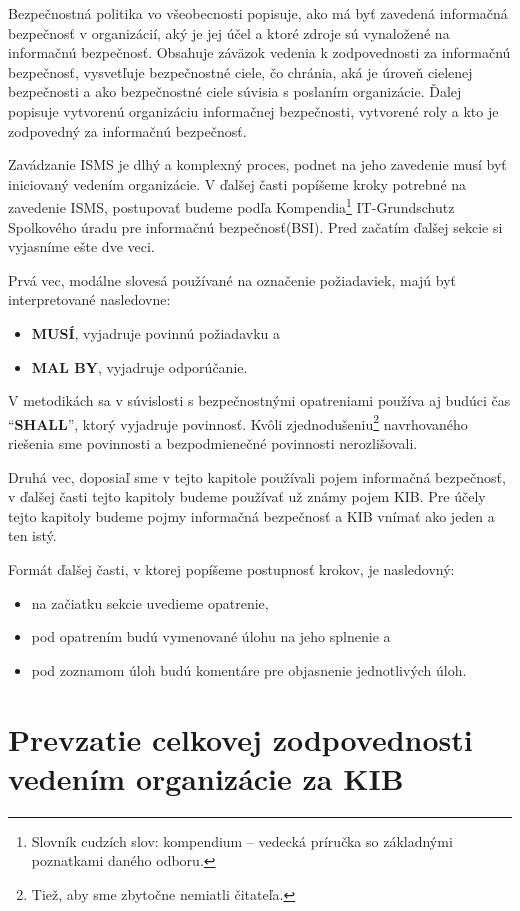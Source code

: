 Bezpečnostná politika vo všeobecnosti popisuje, ako má byť zavedená informačná bezpečnosť v organizácií, aký je jej účel
a ktoré zdroje sú vynaložené na informačnú bezpečnosť. Obsahuje záväzok vedenia k zodpovednosti za informačnú bezpečnosť,
vysvetľuje bezpečnostné ciele, čo chránia, aká je úroveň cielenej bezpečnosti a ako bezpečnostné ciele súvisia s poslaním
organizácie. Ďalej popisuje vytvorenú organizáciu informačnej bezpečnosti, vytvorené roly a kto je zodpovedný za informačnú
bezpečnosť.


Zavádzanie ISMS je dlhý a komplexný proces, podnet na jeho zavedenie musí byť iniciovaný vedením organizácie. V ďalšej časti
popíšeme kroky potrebné na zavedenie ISMS, postupovať budeme podľa Kompendia\footnote{Slovník cudzích slov: kompendium – vedecká
príručka so základnými poznatkami daného odboru.} IT-Grundschutz\cite{GSK} Spolkového úradu pre informačnú bezpečnosť(BSI).
Pred začatím ďalšej sekcie si vyjasníme ešte dve veci.

Prvá vec, modálne slovesá používané na označenie požiadaviek, majú byť interpretované nasledovne:
\begin{itemize}
  \item \textbf{MUSÍ}, vyjadruje povinnú požiadavku a
  \item \textbf{MAL BY}, vyjadruje odporúčanie. 
\end{itemize}
V metodikách sa v súvislosti s bezpečnostnými opatreniami používa aj budúci čas \enquote{\textbf{SHALL}}, ktorý vyjadruje
povinnosť. Kvôli zjednodušeniu\footnote{Tiež, aby sme zbytočne nemiatli čitateľa.} navrhovaného riešenia sme povinnosti
a bezpodmienečné povinnosti nerozlišovali.

Druhá vec, doposiaľ sme v tejto kapitole používali pojem informačná bezpečnosť, v ďalšej časti tejto kapitoly budeme používať
už známy pojem KIB. Pre účely tejto kapitoly budeme pojmy informačná bezpečnosť a KIB vnímať ako jeden a ten istý.

Formát ďalšej časti, v ktorej popíšeme postupnosť krokov, je nasledovný:
\begin{itemize}
  \item na začiatku sekcie uvedieme opatrenie,
  \item pod opatrením budú vymenované úlohu na jeho splnenie a 
  \item pod zoznamom úloh budú komentáre pre objasnenie jednotlivých úloh.
\end{itemize}




\section{Prevzatie celkovej zodpovednosti vedením organizácie za KIB}

